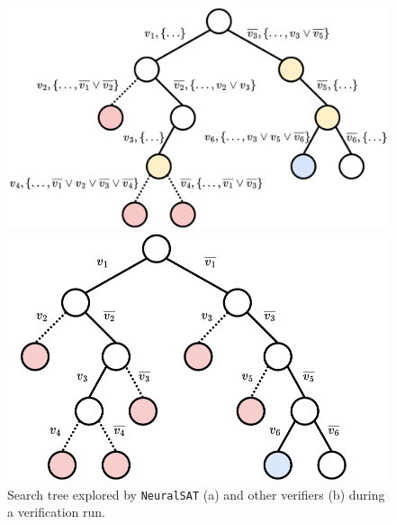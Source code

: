 \documentclass[oneside,11pt,dvipsnames]{book}
\numberwithin{equation}{section}
\theoremstyle{definition}
\theoremstyle{remark}
\newcommand{\tvn}[1]{\iftoggle{usecomment}{{\color{red}{[TVN]: #1}}}{}}
\newcommand{\tool}{\texttt{NeuralSAT}}
\begin{document}
\begin{figure}[t]
    \begin{minipage}[b]{\textwidth}
    \centering
        \begin{minipage}[t]{0.495\textwidth}
            \centering
            \includegraphics[width=\linewidth]{figure/cdcl-tree-clause.png}
            \caption*{(a) \tool{}}
        \end{minipage}
        \hfill
        \begin{minipage}[t]{0.44\textwidth}
            \centering
            \includegraphics[width=\linewidth]{figure/none-cdcl-tree.pdf}
            \caption*{(b) Others}
        \end{minipage}
        \vspace{-0.1in}
        \caption{Search tree explored by \tool{} (a) and other verifiers (b) during a verification run.
        \tvn{Hai, instead of other verifiers can we say this search tree is for a native/general BaB approach?}
}
\end{minipage}
\end{figure}
\end{document}
